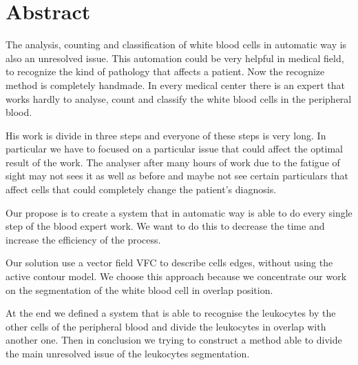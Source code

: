 \chapter*{Abstract}

The analysis, counting and classification of white blood cells in automatic way is also an unresolved issue. This automation could be very helpful in medical field, to recognize the kind of pathology that affects a patient. Now the recognize method is completely handmade. In every medical center there is an expert that works hardly to analyse, count and classify the white blood cells in the peripheral blood.

\bigskip

His work is divide in three steps and everyone of these steps is very long. In particular we have to focused on a particular issue that could affect the optimal result of the work. The analyser after many hours of work due to the fatigue of sight may not sees it as well as before and maybe not see certain particulars that affect cells that could completely change the patient's diagnosis.

\bigskip

Our propose is to create a system that in automatic way is able to do every single step of the blood expert work. We want to do this to decrease the time and increase the efficiency of the process.

\bigskip

Our solution use a vector field VFC to describe cells edges, without using the active contour model. We choose this approach because we concentrate our work on the segmentation of the white blood cell in overlap position.

\bigskip

At the end we defined a system that is able to recognise the leukocytes by the other cells of the peripheral blood and divide the leukocytes in overlap with another one. Then in conclusion we trying to construct a method able to divide the main unresolved issue of the leukocytes segmentation.


